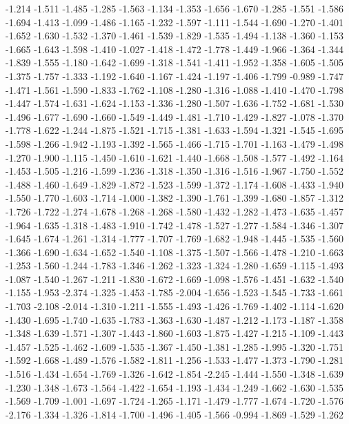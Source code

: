 \documentclass[9pt]{article}
\theoremstyle{plain}
\theoremstyle{definition}
\theoremstyle{remark}
\numberwithin{equation}{section}
\begin{document}
-1.214
-1.511
-1.485
-1.285
-1.563
-1.134
-1.353
-1.656
-1.670
-1.285
-1.551
-1.586
-1.694
-1.413
-1.099
-1.486
-1.165
-1.232
-1.597
-1.111
-1.544
-1.690
-1.270
-1.401
-1.652
-1.630
-1.532
-1.370
-1.461
-1.539
-1.829
-1.535
-1.494
-1.138
-1.360
-1.153
-1.665
-1.643
-1.598
-1.410
-1.027
-1.418
-1.472
-1.778
-1.449
-1.966
-1.364
-1.344
-1.839
-1.555
-1.180
-1.642
-1.699
-1.318
-1.541
-1.411
-1.952
-1.358
-1.605
-1.505
-1.375
-1.757
-1.333
-1.192
-1.640
-1.167
-1.424
-1.197
-1.406
-1.799
-0.989
-1.747
-1.471
-1.561
-1.590
-1.833
-1.762
-1.108
-1.280
-1.316
-1.088
-1.410
-1.470
-1.798
-1.447
-1.574
-1.631
-1.624
-1.153
-1.336
-1.280
-1.507
-1.636
-1.752
-1.681
-1.530
-1.496
-1.677
-1.690
-1.660
-1.549
-1.449
-1.481
-1.710
-1.429
-1.827
-1.078
-1.370
-1.778
-1.622
-1.244
-1.875
-1.521
-1.715
-1.381
-1.633
-1.594
-1.321
-1.545
-1.695
-1.598
-1.266
-1.942
-1.193
-1.392
-1.565
-1.466
-1.715
-1.701
-1.163
-1.479
-1.498
-1.270
-1.900
-1.115
-1.450
-1.610
-1.621
-1.440
-1.668
-1.508
-1.577
-1.492
-1.164
-1.453
-1.505
-1.216
-1.599
-1.236
-1.318
-1.350
-1.316
-1.516
-1.967
-1.750
-1.552
-1.488
-1.460
-1.649
-1.829
-1.872
-1.523
-1.599
-1.372
-1.174
-1.608
-1.433
-1.940
-1.550
-1.770
-1.603
-1.714
-1.000
-1.382
-1.390
-1.761
-1.399
-1.680
-1.857
-1.312
-1.726
-1.722
-1.274
-1.678
-1.268
-1.268
-1.580
-1.432
-1.282
-1.473
-1.635
-1.457
-1.964
-1.635
-1.318
-1.483
-1.910
-1.742
-1.478
-1.527
-1.277
-1.584
-1.346
-1.307
-1.645
-1.674
-1.261
-1.314
-1.777
-1.707
-1.769
-1.682
-1.948
-1.445
-1.535
-1.560
-1.366
-1.690
-1.634
-1.652
-1.540
-1.108
-1.375
-1.507
-1.566
-1.478
-1.210
-1.663
-1.253
-1.560
-1.244
-1.783
-1.346
-1.262
-1.323
-1.324
-1.280
-1.659
-1.115
-1.493
-1.087
-1.540
-1.267
-1.211
-1.830
-1.672
-1.669
-1.098
-1.576
-1.451
-1.632
-1.540
-1.155
-1.953
-2.374
-1.325
-1.453
-1.785
-2.004
-1.656
-1.523
-1.545
-1.733
-1.661
-1.703
-2.108
-2.014
-1.310
-1.211
-1.555
-1.493
-1.426
-1.769
-1.402
-1.114
-1.620
-1.430
-1.695
-1.740
-1.635
-1.783
-1.363
-1.630
-1.487
-1.212
-1.173
-1.187
-1.358
-1.348
-1.639
-1.571
-1.307
-1.443
-1.860
-1.603
-1.875
-1.427
-1.215
-1.109
-1.443
-1.457
-1.525
-1.462
-1.609
-1.535
-1.367
-1.450
-1.381
-1.285
-1.995
-1.320
-1.751
-1.592
-1.668
-1.489
-1.576
-1.582
-1.811
-1.256
-1.533
-1.477
-1.373
-1.790
-1.281
-1.516
-1.434
-1.654
-1.769
-1.326
-1.642
-1.854
-2.245
-1.444
-1.550
-1.348
-1.639
-1.230
-1.348
-1.673
-1.564
-1.422
-1.654
-1.193
-1.434
-1.249
-1.662
-1.630
-1.535
-1.569
-1.709
-1.001
-1.697
-1.724
-1.265
-1.171
-1.479
-1.777
-1.674
-1.720
-1.576
-2.176
-1.334
-1.326
-1.814
-1.700
-1.496
-1.405
-1.566
-0.994
-1.869
-1.529
-1.262
\end{document}
